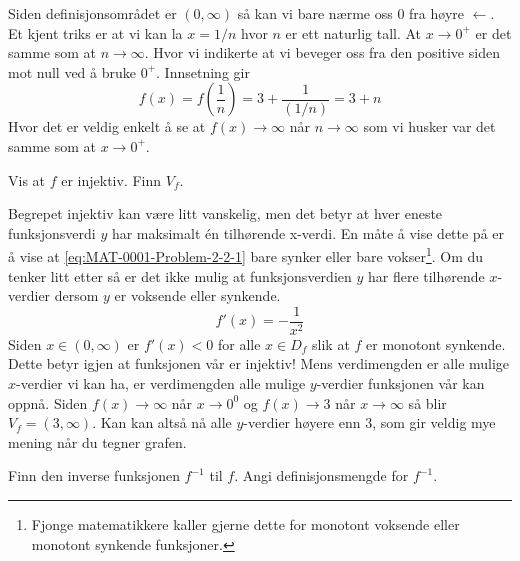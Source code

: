 \documentclass[a4paper,11pt]{article}
\begin{document}
\begin{solution}
    Siden definisjonsområdet er $(0, \infty)$ så kan vi bare
    nærme oss $0$ fra høyre $\leftarrow$. Et kjent triks er at vi kan la
    $x = 1/n$ hvor $n$ er ett naturlig tall. At $x \to 0^+$ er det samme som at 
    $n \to \infty$. Hvor vi indikerte at vi beveger oss fra 
    den positive siden mot null ved å bruke $0^{+}$. Innsetning gir
    \begin{equation*}
        f(x) = f(\frac{1}{n}) = 3 + \frac{1}{(1/n)} = 3 + n
    \end{equation*}
    Hvor det er veldig enkelt å se at $f(x) \to \infty$ når $n \to \infty$
    som vi husker var det samme som at $x \to 0^{+}$.
\end{solution}

\begin{subproblem}
    Vis at $f$ er injektiv. Finn $V_f$.
\end{subproblem}

\begin{solution}
    Begrepet injektiv kan være litt vanskelig, men det betyr at hver eneste funksjonsverdi $y$ har maksimalt én tilhørende x-verdi. En måte å vise dette på er å vise at \cref{eq:MAT-0001-Problem-2-2-1} bare synker eller bare vokser\footnote{Fjonge matematikkere kaller gjerne dette for monotont voksende eller monotont synkende funksjoner.}.
    Om du tenker litt etter så er det ikke mulig at funksjonsverdien $y$ har flere tilhørende
    $x$-verdier dersom $y$ er voksende eller synkende. 
    \begin{equation}
        f'(x) = -\frac{1}{x^2}
    \end{equation}
    Siden $x \in (0, \infty)$ er $f'(x) < 0$ for alle $x \in D_f$ slik at $f$ er monotont synkende. 
    Dette betyr igjen at funksjonen vår er injektiv! Mens verdimengden er alle mulige $x$-verdier
    vi kan ha, er verdimengden alle mulige $y$-verdier funksjonen vår kan oppnå. 
    Siden $f(x) \to \infty$ når $x \to 0^{0}$ og $f(x) \to 3$ når $x \to \infty$ så blir
    $V_f = (3,\infty)$. Kan kan altså nå alle $y$-verdier høyere enn $3$, som gir veldig mye mening 
    når du tegner grafen.
\end{solution}

\begin{subproblem}
    Finn den inverse funksjonen $f^{-1}$ til $f$. Angi definisjonsmengde for $f^{-1}$.
\end{subproblem}
\end{document}
